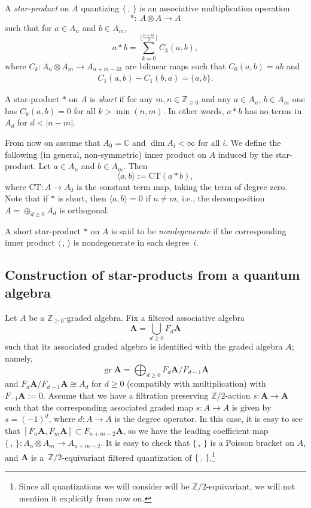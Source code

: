 \documentclass[11pt]{article}
\numberwithin{equation}{section}
\numberwithin{equation}{section}
\begin{document}
\begin{Definition}
A \emph{star-product} on $A$ quantizing $\lbrace\,,\,\rbrace$ is an associative multiplication operation
\[
*\colon \ A \otimes A \to A
\]
such that for $a \in A_n$ and $b \in A_m$,
\[
a*b = \sum_{k = 0}^{\lfloor \frac{n+m}{2}\rfloor} C_k(a,b),
\]
where $C_k \colon A_n \otimes A_m \to A_{n+m-2k}$ are bilinear maps such that $C_0(a,b) = a b$ and
\begin{gather*}
C_1(a,b) - C_1(b,a) = \{a,b\}.
\end{gather*}
\end{Definition}

\begin{Definition} A star-product $*$ on $A$ is \emph{short} if
for any $m,n\in {\mathbb Z}_{\ge 0}$ and any $a \in A_n$, $b \in A_m$ one has $C_k(a,b) = 0$ for all $k > \min(n,m)$. In other words, $a * b$ has no terms in $A_d$ for $d < |n - m|$.
\end{Definition}

From now on assume that $A_0={\mathbb C}$ and $\dim A_i<\infty$ for all $i$. We define the following (in general, non-symmetric) inner product on $A$ induced by the star-product. Let $a \in A_n$ and $b \in A_m$. Then
\[
\langle a, b \rangle := \text{CT}(a * b),
\]
where $\text{CT}\colon A \to A_0$ is the constant term map, taking the term of degree zero. Note that if $*$ is short, then $\langle a, b \rangle = 0$ if $n \neq m$, i.e., the decomposition $A=\oplus_{d\ge 0}A_d$ is orthogonal.

\begin{Definition} A short star-product $*$ on $A$ is said to be {\it nondegenerate} if the corresponding inner product $\langle \,,\,\rangle$ is nondegenerate in each degree~$i$.
\end{Definition}

\subsection{Construction of star-products from a quantum algebra}\label{constru} Let $A$ be a ${\mathbb Z}_{\ge 0}$-graded algebra. Fix a filtered associative algebra
\[
{{\mathbf A}} = \bigcup_{d \geq 0} F_d{{\mathbf A}}
\]
such that its associated graded algebra is identified with the graded algebra $A$; namely,
\[
\operatorname{gr}{{\mathbf A}} = \bigoplus_{d \geq 0} F_{d}{{\mathbf A}}/F_{d-1}{{\mathbf A}}
\]
and $F_{d}{{\mathbf A}}/F_{d-1}{{\mathbf A}} \cong A_d$ for $d \geq 0$ (compatibly with multiplication) with $F_{-1}{{\mathbf A}} := 0$.
Assume that we have a filtration preserving ${\mathbb Z}/2$-action $s\colon {{\mathbf A}}\to {{\mathbf A}}$ such that the corresponding associated graded map $s\colon A\to A$ is given by $s=(-1)^d$, where $d\colon A\to A$ is the degree operator. In this case, it is easy to see that $[F_n{{\mathbf A}},F_m{{\mathbf A}}]\subset F_{n+m-2}{{\mathbf A}}$, so we have the leading coefficient map $\lbrace\,,\,\rbrace\colon A_n\otimes A_m\to A_{n+m-2}$. It is easy to check that $\lbrace\,,\,\rbrace$ is a Poisson bracket on $A$, and ${{\mathbf A}}$ is a~${\mathbb Z}/2$-equivariant filtered quantization of $\lbrace\,,\,\rbrace$.\footnote{Since all quantizations we will consider will be ${\mathbb Z}/2$-equivariant, we will not mention it explicitly from now on.}
\end{document}
